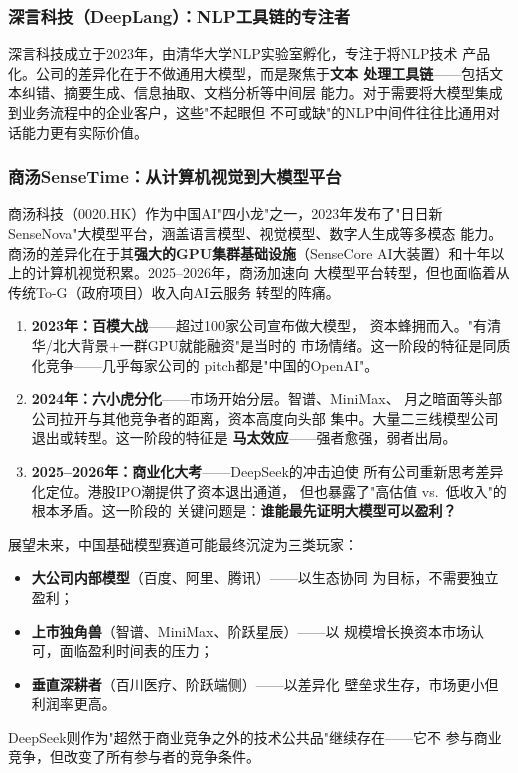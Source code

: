 \subsubsection{深言科技（DeepLang）：NLP工具链的专注者}
深言科技成立于2023年，由清华大学NLP实验室孵化，专注于将NLP技术
产品化。公司的差异化在于不做通用大模型，而是聚焦于\textbf{文本
处理工具链}——包括文本纠错、摘要生成、信息抽取、文档分析等中间层
能力。对于需要将大模型集成到业务流程中的企业客户，这些"不起眼但
不可或缺"的NLP中间件往往比通用对话能力更有实际价值。

\subsubsection{商汤SenseTime：从计算机视觉到大模型平台}
商汤科技（0020.HK）作为中国AI"四小龙"之一，2023年发布了"日日新
SenseNova"大模型平台，涵盖语言模型、视觉模型、数字人生成等多模态
能力。商汤的差异化在于其\textbf{强大的GPU集群基础设施}（SenseCore
AI大装置）和十年以上的计算机视觉积累。2025--2026年，商汤加速向
大模型平台转型，但也面临着从传统To-G（政府项目）收入向AI云服务
转型的阵痛。

\begin{corebox}
\begin{enumerate}
  \item \textbf{2023年：百模大战}——超过100家公司宣布做大模型，
    资本蜂拥而入。"有清华/北大背景+一群GPU就能融资"是当时的
    市场情绪。这一阶段的特征是同质化竞争——几乎每家公司的
    pitch都是"中国的OpenAI"。

  \item \textbf{2024年：六小虎分化}——市场开始分层。智谱、MiniMax、
    月之暗面等头部公司拉开与其他竞争者的距离，资本高度向头部
    集中。大量二三线模型公司退出或转型。这一阶段的特征是
    \textbf{马太效应}——强者愈强，弱者出局。

  \item \textbf{2025--2026年：商业化大考}——DeepSeek的冲击迫使
    所有公司重新思考差异化定位。港股IPO潮提供了资本退出通道，
    但也暴露了"高估值 vs.\ 低收入"的根本矛盾。这一阶段的
    关键问题是：\textbf{谁能最先证明大模型可以盈利？}
\end{enumerate}

展望未来，中国基础模型赛道可能最终沉淀为三类玩家：
\begin{itemize}
  \item \textbf{大公司内部模型}（百度、阿里、腾讯）——以生态协同
    为目标，不需要独立盈利；
  \item \textbf{上市独角兽}（智谱、MiniMax、阶跃星辰）——以
    规模增长换资本市场认可，面临盈利时间表的压力；
  \item \textbf{垂直深耕者}（百川医疗、阶跃端侧）——以差异化
    壁垒求生存，市场更小但利润率更高。
\end{itemize}
DeepSeek则作为"超然于商业竞争之外的技术公共品"继续存在——它不
参与商业竞争，但改变了所有参与者的竞争条件。
\end{corebox}


